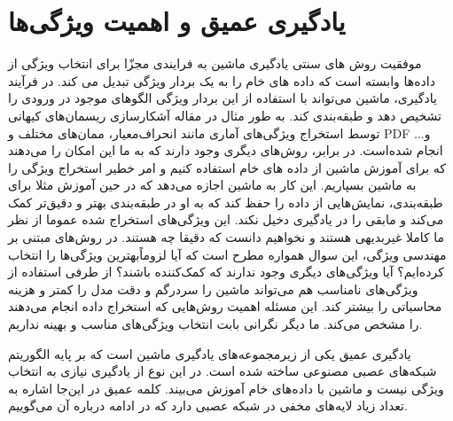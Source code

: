 
\section{یادگیری عمیق و اهمیت ویژگی‌ها} 
\label{sec:Deep_feature}
\par
موفقیت روش های سنتی یادگیری ماشین به فرایندی مجزّا برای انتخاب ویژگی از داده‌ها وابسته است که داده های خام را به یک بردار ویژگی تبدیل می کند. در فرآیند یادگیری، ماشین می‌تواند با استفاده از این بردار ویژگی الگوهای موجود در ورودی را تشخیص دهد و طبقه‌بندی کند.
\cite{lecun2015deep}
به طور مثال در مقاله
\cite{vafaei2017multiscale} 
آشکارسازی ریسمان‌های کیهانی توسط استخراج ویژگی‌های آماری مانند انحراف‌معیار، ممان‌های مختلف و PDF 
و... انجام شده‌است. 
در برابر، روش‌های دیگری وجود دارند که به ما این امکان را می‌دهند که برای آموزش ماشین از داده های خام استفاده کنیم  و امر خطیر استخراج ویژگی را به ماشین بسپاریم. این کار به ماشین اجازه می‌دهد که در حین آموزش مثلا برای طبقه‌بندی، نمایش‌هایی از داده را حفظ کند که به او در طبقه‌بندی بهتر و دقیق‌تر کمک می‌کند و مابقی را در یادگیری دخیل نکند.
\cite{bengio2013representation}
این ویژگی‌های استخراج شده عموما از نظر ما کاملا غیربدیهی هستند و نخواهیم دانست که دقیقا چه هستند.
در روش‌های مبتنی بر مهندسی ویژگی، این سوال همواره مطرح است که آیا لزوماًبهترین ویژگی‌ها را انتخاب کرده‌ایم؟ آیا ویژگی‌های دیگری وجود ندارند که کمک‌کننده باشند؟ از طرفی استفاده از ویژگی‌های نامناسب هم می‌تواند ماشین را سردرگم و دقت مدل را کمتر و هزینه محاسباتی را بیشتر کند. این مسئله اهمیت روش‌هایی که استخراج داده انجام می‌دهند را مشخص می‌کند. ما دیگر نگرانی بابت انتخاب ویژگی‌های مناسب و بهینه نداریم.
\par
یادگیری عمیق 
یکی از زیرمجموعه‌های یادگیری ماشین است که بر پایه الگوریتم شبکه‌های عصبی مصنوعی
ساخته شده است. در این نوع از یادگیری نیازی به انتخاب ویژگی نیست و ماشین با داده‌های خام آموزش می‌بیند. کلمه عمیق در این‌جا اشاره به تعداد زیاد لایه‌های مخفی در شبکه عصبی دارد که در ادامه درباره آن می‌گوییم. 




